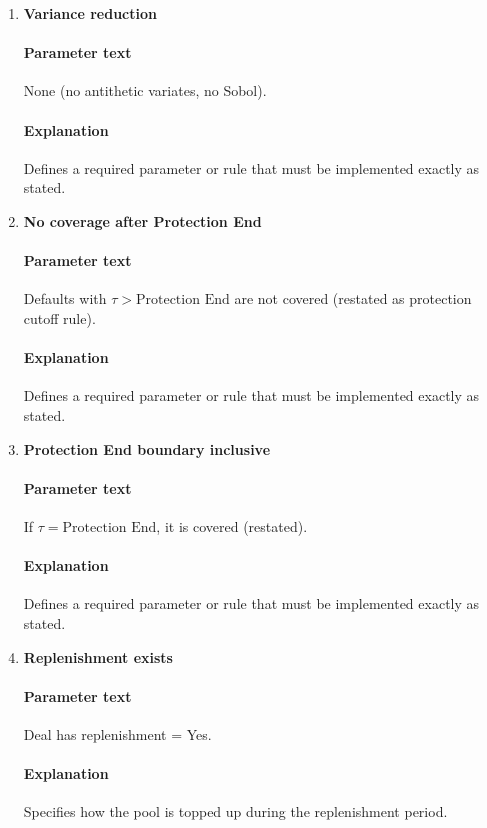 \documentclass[11pt]{article}
\begin{document}
\begin{enumerate}[label=\arabic*),leftmargin=*,align=left]
\paragraph{Explanation} Specifies the dependency structure across obligors.

\item \textbf{Variance reduction}
\paragraph{Parameter text} None (no antithetic variates, no Sobol).
\paragraph{Explanation} Defines a required parameter or rule that must be implemented exactly as stated.

\item \textbf{No coverage after Protection End}
\paragraph{Parameter text} Defaults with $\tau > \text{Protection End}$ are not covered (restated as protection cutoff rule).
\paragraph{Explanation} Defines a required parameter or rule that must be implemented exactly as stated.

\item \textbf{Protection End boundary inclusive}
\paragraph{Parameter text} If $\tau = \text{Protection End}$, it is covered (restated).
\paragraph{Explanation} Defines a required parameter or rule that must be implemented exactly as stated.

\item \textbf{Replenishment exists}
\paragraph{Parameter text} Deal has replenishment = Yes.
\paragraph{Explanation} Specifies how the pool is topped up during the replenishment period.


\end{enumerate}
\end{document}
